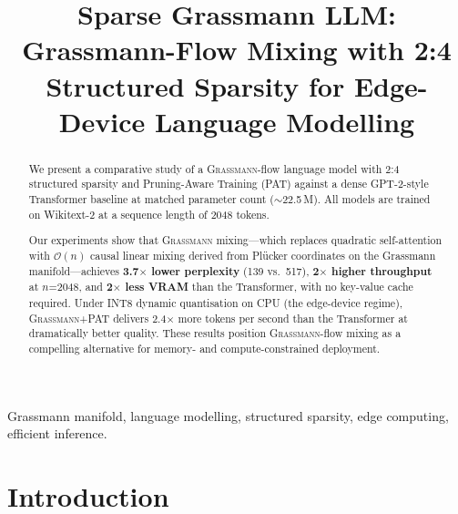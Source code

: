 \documentclass[conference]{IEEEtran}
\newcommand{\grassmann}{\textsc{Grassmann}}
\newcommand{\pat}{\textsc{PAT}}
\newcommand{\seqlen}{\ensuremath{n}}
\newcommand{\bigO}[1]{\ensuremath{\mathcal{O}(#1)}}
\begin{document}
\title{%
  Sparse Grassmann LLM: Grassmann-Flow Mixing with 2:4 Structured Sparsity for Edge-Device Language Modelling
}

\author{
\and
{}
}

\maketitle

\begin{abstract}
We present a comparative study of a \grassmann{}-flow language model with
2:4 structured sparsity and Pruning-Aware Training (\pat{}) against a dense
GPT-2-style Transformer baseline at matched parameter count
($\sim$22.5\,M). All models are trained on Wikitext-2 at a sequence length
of 2048 tokens.

Our experiments show that \grassmann{} mixing—which replaces quadratic
self-attention with \bigO{n} causal linear mixing derived from Pl\"ucker
coordinates on the Grassmann manifold—achieves \textbf{3.7$\times$ lower
perplexity} (139 vs.\ 517), \textbf{2$\times$ higher throughput} at
\seqlen{}=2048, and \textbf{2$\times$ less VRAM} than the Transformer,
with no key-value cache required. Under INT8 dynamic quantisation on CPU
(the edge-device regime), \grassmann{}+\pat{} delivers 2.4$\times$ more
tokens per second than the Transformer at dramatically better quality.
These results position \grassmann{}-flow mixing as a compelling
alternative for memory- and compute-constrained deployment.
\end{abstract}

\begin{IEEEkeywords}
Grassmann manifold, language modelling, structured sparsity, edge computing, efficient inference.
\end{IEEEkeywords}

\section{Introduction}
\label{sec:intro}
\end{document}
